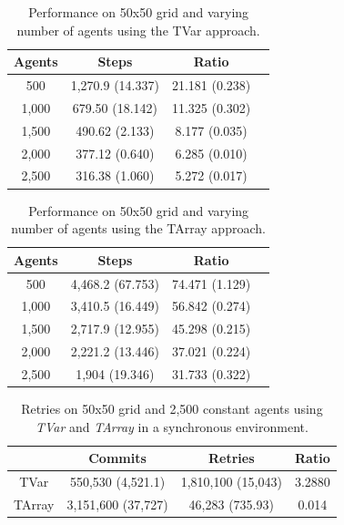 \begin{table}
	\centering
  	\begin{tabular}{ c || c | c | c }
        Agents  & Steps            & Ratio          \\ \hline \hline 
    	500     & 1,270.9 (14.337) & 21.181 (0.238) \\ \hline
   		1,000   & 679.50 (18.142)  & 11.325 (0.302) \\ \hline
   		1,500   & 490.62 (2.133)   & 8.177 (0.035)  \\ \hline
   		2,000   & 377.12 (0.640)   & 6.285 (0.010)  \\ \hline 
   		2,500   & 316.38 (1.060)   & 5.272 (0.017)  \\ \hline 
   	\end{tabular}
  	
  	\caption{Performance on 50x50 grid and varying number of agents using the TVar approach.}
	\label{tab:tvar_results_agentsscale_time}
\end{table}

\begin{table}
	\centering
  	\begin{tabular}{ c || c | c | c }
        Agents  & Steps            & Ratio          \\ \hline \hline 
    	500     & 4,468.2 (67.753) & 74.471 (1.129) \\ \hline
   		1,000   & 3,410.5 (16.449) & 56.842 (0.274) \\ \hline
   		1,500   & 2,717.9 (12.955) & 45.298 (0.215) \\ \hline
   		2,000   & 2,221.2 (13.446) & 37.021 (0.224) \\ \hline 
   		2,500   & 1,904 (19.346)   & 31.733 (0.322) \\ \hline 
   	\end{tabular}
  	
  	\caption{Performance on 50x50 grid and varying number of agents using the TArray approach.}
	\label{tab:tarray_results_agentsscale_time}
\end{table}

\begin{table}
	\centering
  	\begin{tabular}{ c || c | c | c }
               & Commits            & Retries              & Ratio \\ \hline \hline 
		TVar   & 550,530 (4,521.1)  & 1,810,100 (15,043) & 3.2880 \\ \hline   		
   		TArray & 3,151,600 (37,727) & 46,283 (735.93)      & 0.014 \\ \hline
   	\end{tabular}
  	
  	\caption{Retries on 50x50 grid and 2,500 constant agents using \textit{TVar} and \textit{TArray} in a synchronous environment.}
	\label{tab:tvartarray_results_agentsscale_retries}
\end{table}



